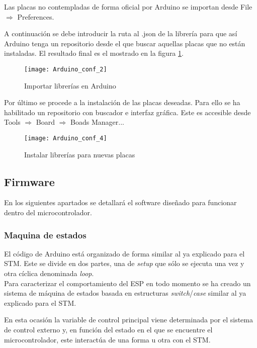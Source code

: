 Las placas no contempladas de forma oficial por Arduino se importan desde File $\Rightarrow$ Preferences.

A continuación se debe introducir la ruta al .json de la librería para que así Arduino tenga un repositorio desde el que buscar aquellas placas que no están instaladas. El resultado final es el mostrado en la figura \ref{fig:Arduino_conf_2}.

\begin{figure} [h]
    \centering
    \texttt{[image: Arduino\_conf\_2]}
    \caption{Importar librerías en Arduino}
    \label{fig:Arduino_conf_2}
\end{figure}

Por último se procede a la instalación de las placas deseadas. Para ello se ha habilitado un repositorio con buscador e interfaz gráfica. Este es accesible desde Tools $\Rightarrow$ Board $\Rightarrow$ Boads Manager... 

\begin{figure} [h]
    \centering
    \texttt{[image: Arduino\_conf\_4]}
    \caption{Instalar librerías para nuevas placas}
    \label{fig:Arduino_conf}
\end{figure}

\subsection{Firmware\label{sec:Software_Arduino_firm}}

En los siguientes apartados se detallará el software diseñado para funcionar dentro del microcontrolador. 

\subsubsection{Maquina de estados\label{sec:Software_Arduino_MEstados}}

El código de Arduino está organizado de forma similar al ya explicado para el STM. Este se divide en dos partes, una de \textit{setup} que sólo se ejecuta una vez y otra cíclica denominada \textit{loop}.\\
Para caracterizar el comportamiento del ESP en todo momento se ha creado un sistema de máquina de estados basada en estructuras \textit{switch}/\textit{case} similar al ya explicado para el STM.

En esta ocasión la variable de control principal viene determinada por el sistema de control externo y, en función del estado en el que se encuentre el microcontrolador, este interactúa de una forma u otra con el STM.

